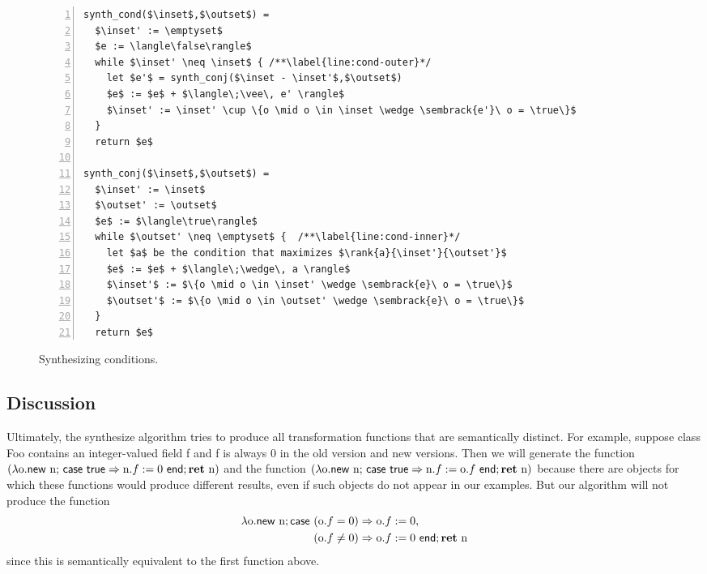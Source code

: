 \documentclass[natbib]{sigplanconf}
\begin{document}
\begin{figure}
\hspace*{.2in}
\begin{minipage}{4.3in}
\begin{lstlisting}[numbers=left]
synth_cond($\inset$,$\outset$) =
  $\inset' := \emptyset$
  $e := \langle\false\rangle$
  while $\inset' \neq \inset$ { /**\label{line:cond-outer}*/
    let $e'$ = synth_conj($\inset - \inset'$,$\outset$)
    $e$ := $e$ + $\langle\;\vee\, e' \rangle$
    $\inset' := \inset' \cup \{o \mid o \in \inset \wedge \sembrack{e'}\ o = \true\}$
  }
  return $e$

synth_conj($\inset$,$\outset$) =
  $\inset' := \inset$
  $\outset' := \outset$
  $e$ := $\langle\true\rangle$
  while $\outset' \neq \emptyset$ {  /**\label{line:cond-inner}*/
    let $a$ be the condition that maximizes $\rank{a}{\inset'}{\outset'}$
    $e$ := $e$ + $\langle\;\wedge\, a \rangle$
    $\inset'$ := $\{o \mid o \in \inset' \wedge \sembrack{e}\ o = \true\}$
    $\outset'$ := $\{o \mid o \in \outset' \wedge \sembrack{e}\ o = \true\}$
  }
  return $e$
\end{lstlisting}
\end{minipage}
\caption{Synthesizing conditions.\label{fig:cond-synthesis}}
\end{figure}

\subsection{Discussion}
\label{sec:synth-discuss}

Ultimately, the \textsf{synthesize} algorithm tries to produce all transformation functions that
are semantically distinct.  For example, suppose class \textsf{Foo}
contains an integer-valued field \textsf{f} and \textsf{f} is always 0
in the old version and new versions.  Then we will generate the
function $(\lambda \textrm{o}. \mathsf{new}\ \textrm{n};\, \textsf{case } \mathsf{true} \Rightarrow
\textrm{n}.f := 0 \textsf{ end}; \textbf{ret}\ \textrm{n})$ and the function
$(\lambda \textrm{o}. \mathsf{new}\ \textrm{n};\, \textsf{case } \mathsf{true} \Rightarrow \textrm{n}.f
:= \textrm{o}.f \textsf{ end}; \textbf{ret}\ \textrm{n})$ because there are objects for
which these functions would produce different results, even if such
objects do not appear in our examples.  But our algorithm will not
produce the function 
\begin{align*}
\lambda \textrm{o}. \mathsf{new}\ \textrm{n}; \textsf{case } (\textrm{o}.f = 0) &\Rightarrow \textrm{o}.f := 0,\\
 (\textrm{o}.f \neq 0) &\Rightarrow \textrm{o}.f := 0\textsf{ end}; \textbf{ret}\ \textrm{n}
\end{align*}
since this is semantically equivalent to the first function above.
\end{document}
